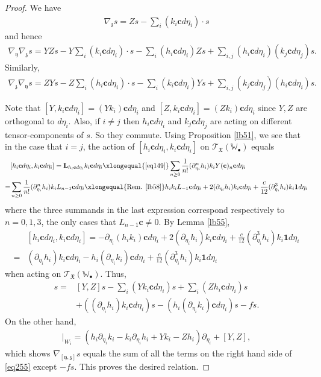 \documentclass[12pt,a4paper,notitlepage]{report}
\theoremstyle{definition}
\theoremstyle{plain}
\newcommand{\fk}{\mathfrak}
\newcommand{\wtd}{\widetilde}
\newcommand{\id}{\mathbf{1}}
\newcommand{\scr}{\mathscr}
\newcommand{\yk}{\mathfrak y}
\newcommand{\zk}{\mathfrak z}
\newcommand{\mbf}{\mathbf}
\newcommand{\blt}{\bullet}
\newcommand{\Wbb}{\mathbb W}
\newcommand{\cbf}{\mathbf c}
\numberwithin{equation}{section}
\begin{document}
\begin{proof}
We have
\begin{align*}
\nabla_\zk s=Zs-\sum_i (k_i\cbf d\eta_i)\cdot s
\end{align*}
and hence
\begin{align*}
\nabla_\yk\nabla_\zk s=YZs-Y\sum_i (k_i\cbf d\eta_i)\cdot s-\sum_i(h_i\cbf d\eta_i) Zs+\sum_{i,j} (h_i\cbf d\eta_i)(k_j\cbf d\eta_j) s.
\end{align*}
Similarly,
\begin{align*}
\nabla_\zk\nabla_\yk s=ZYs-Z\sum_i (h_i\cbf d\eta_i)\cdot s-\sum_i(k_i\cbf d\eta_i) Ys+\sum_{i,j} (k_j\cbf d\eta_j)(h_i\cbf d\eta_i) s.
\end{align*}

Note that $[Y,k_i\cbf d\eta_i]=(Yk_i)\cbf d\eta_i$ and $[Z,k_i\cbf d\eta_i]=(Zk_i)\cbf d\eta_i$ since $Y,Z$ are orthogonal to $d\eta_i$. Also, if $i\neq j$ then $h_i\cbf d\eta_i$ and $k_j\cbf d\eta_j$ are acting on different tensor-components of $s$. So they commute. Using Proposition \ref{lb51}, we see that in the case that $i=j$, the action of $[h_i\cbf d\eta_i,k_i\cbf d\eta_i]$ on $\scr T_{\fk X}(\Wbb_\blt)$ equals
\begin{align*}
&[h_i\cbf d\eta_i,k_i\cbf d\eta_i]=\mbf L_{h_i\cbf d\eta_i}k_i\cbf d\eta_i \xlongequal{\eqref{eq149}} \sum_{n\geq 0}\frac 1{n!}(\partial_{\eta_i}^nh_i)k_i Y(\cbf)_n\cbf d\eta_i\\
=&\sum_{n\geq 0}\frac 1{n!}(\partial_{\eta_i}^nh_i) k_i L_{n-1}\cbf d\eta_i \xlongequal{\text{Rem. }\ref{lb58}} h_ik_i L_{-1}\cbf d\eta_i+ 2(\partial_{\eta_i}h_i)k_i\cbf d\eta_i+\frac c{12} (\partial_{\eta_i}^3h_i)k_i\id d\eta_i
\end{align*}
where the three summands in the last expression correspond respectively to $n=0,1,3$, the only cases that $L_{n-1}\cbf\neq 0$. By Lemma \ref{lb55}, 
\begin{align*}
&[h_i\cbf d\eta_i,k_i\cbf d\eta_i]=-\partial_{\eta_i}(h_ik_i) \cbf d\eta_i+ 2(\partial_{\eta_i}h_i)k_i\cbf d\eta_i+\frac c{12} (\partial_{\eta_i}^3h_i)k_i\id d\eta_i\\
=&(\partial_{\eta_i}h_i)k_i\cbf d\eta_i-h_i(\partial_{\eta_i}k_i)\cbf d\eta_i+\frac c{12} (\partial_{\eta_i}^3h_i)k_i\id d\eta_i
\end{align*}
when acting on $\scr T_{\fk X}(\Wbb_\blt)$. Thus, 
\begin{align}
[\nabla_\yk,\nabla_\zk]s=&[Y,Z]s-\sum_i (Yk_i\cbf d\eta_i) s+\sum_i(Zh_i\cbf d\eta_i) s\nonumber\\
&+((\partial_{\eta_i}h_i)k_i\cbf d\eta_i)s-(h_i(\partial_{\eta_i}k_i)\cbf d\eta_i)s-fs.\label{eq255}
\end{align}
On the other hand,
\begin{align*}
[\wtd\yk,\wtd\zk]|_{W_i}=(h_i\partial_{\eta_i}k_i-k_i\partial_{\eta_i}h_i+Yk_i-Zh_i)\partial_{\eta_i}+[Y,Z],
\end{align*}
which shows $\nabla_{[\yk,\zk]}s$ equals the sum of all the terms on the right hand side of \eqref{eq255} except $-fs$. This proves the desired relation.
\end{proof}
\end{document}
